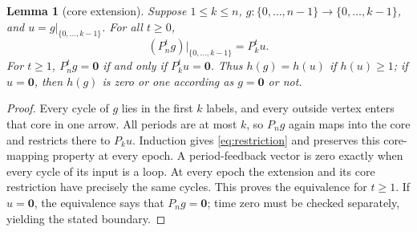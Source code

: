 \documentclass[a4paper,10pt]{amsart}
\newtheorem{lemma}[theorem]{Lemma}
\theoremstyle{remark}
\newcommand{\zero}{\boldsymbol 0}
\begin{document}
\begin{lemma}[core extension]\label{lem:core}
Suppose $1\le k\le n$, $g:\{0,\ldots,n-1\}\to\{0,\ldots,k-1\}$,
and $u=g|_{\{0,\ldots,k-1\}}$. For all $t\ge0$,
\begin{equation}\label{eq:restriction}
 (P_n^t g)|_{\{0,\ldots,k-1\}}=P_k^t u.
\end{equation}
For $t\ge1$, $P_n^t g=\zero$ if and only if $P_k^t u=\zero$.
Thus $h(g)=h(u)$ if $h(u)\ge1$; if $u=\zero$, then $h(g)$ is zero or
one according as $g=\zero$ or not.
\end{lemma}
\begin{proof}
Every cycle of $g$ lies in the first $k$ labels, and every outside vertex
enters that core in one arrow. All periods are at most $k$, so $P_ng$
again maps into the core and restricts there to $P_ku$. Induction gives
\eqref{eq:restriction} and preserves this core-mapping property at every
epoch. A period-feedback vector is zero exactly when every cycle of its
input is a loop. At every epoch the extension and its core restriction
have precisely the same cycles. This proves the equivalence for $t\ge1$.
If $u=\zero$, the equivalence says that $P_ng=\zero$; time zero must be
checked separately, yielding the stated boundary.
\end{proof}
\end{document}

